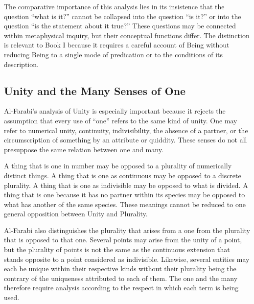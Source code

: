 \label{para:VS.B01.P01.C08.S12.SS04.P006}

The comparative importance of this
analysis lies in its insistence that
the question ``what is it?'' cannot
be collapsed into the question
``is it?'' or into the question
``is the statement about it true?''
These questions may be connected
within metaphysical inquiry, but
their conceptual functions differ.
The distinction is relevant to Book I
because it requires a careful account
of Being without reducing Being to
a single mode of predication or
to the conditions of its description.



\subsection{Unity and the Many Senses of One}
\label{subsec:ch08-farabi-unity}

\label{para:VS.B01.P01.C08.S12.SS05.P001}

Al-Farabi's analysis of Unity is especially
important because it rejects the assumption
that every use of ``one'' refers to the
same kind of unity. One may refer to
numerical unity, continuity, indivisibility,
the absence of a partner, or the
circumscription of something by an
attribute or quiddity. These senses
do not all presuppose the same relation
between one and many.
\citep[sec.~3.6]{MennAlFarabiMetaphysicsSEP2026}

\label{para:VS.B01.P01.C08.S12.SS05.P002}

A thing that is one in number may be
opposed to a plurality of numerically
distinct things. A thing that is one
as continuous may be opposed to a
discrete plurality. A thing that is
one as indivisible may be opposed
to what is divided. A thing that is
one because it has no partner within
its species may be opposed to what
has another of the same species.
These meanings cannot be reduced
to one general opposition between
Unity and Plurality.

\label{para:VS.B01.P01.C08.S12.SS05.P003}

Al-Farabi also distinguishes the
plurality that arises from a one
from the plurality that is opposed
to that one. Several points may
arise from the unity of a point,
but the plurality of points is not
the same as the continuous extension
that stands opposite to a point
considered as indivisible. Likewise,
several entities may each be unique
within their respective kinds without
their plurality being the contrary
of the uniqueness attributed to
each of them. The one and the many
therefore require analysis according
to the respect in which each term
is being used.
\citep[sec.~3.6]{MennAlFarabiMetaphysicsSEP2026}

